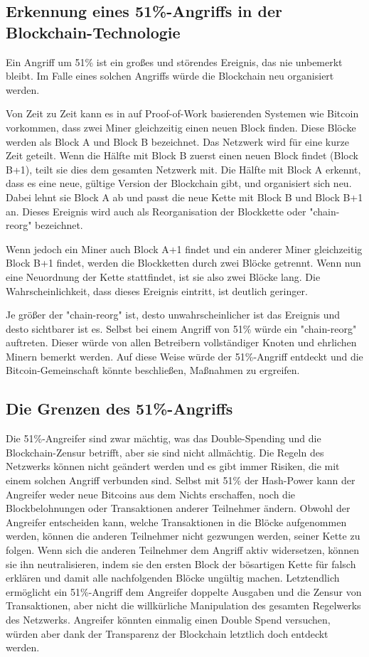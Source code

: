 \subsection{Erkennung eines 51\%-Angriffs in der Blockchain-Technologie}
Ein Angriff um 51\% ist ein großes und störendes Ereignis, das nie unbemerkt bleibt. Im Falle eines solchen Angriffs würde die Blockchain neu organisiert werden.

Von Zeit zu Zeit kann es in auf Proof-of-Work basierenden Systemen wie Bitcoin vorkommen, dass zwei Miner gleichzeitig einen neuen Block finden. Diese Blöcke werden als Block A und Block B bezeichnet. Das Netzwerk wird für eine kurze Zeit geteilt. Wenn die Hälfte mit Block B zuerst einen neuen Block findet (Block B+1), teilt sie dies dem gesamten Netzwerk mit. Die Hälfte mit Block A erkennt, dass es eine neue, gültige Version der Blockchain gibt, und organisiert sich neu. Dabei lehnt sie Block A ab und passt die neue Kette mit Block B und Block B+1 an. Dieses Ereignis wird auch als Reorganisation der Blockkette oder "chain-reorg" bezeichnet.

Wenn jedoch ein Miner auch Block A+1 findet und ein anderer Miner gleichzeitig Block B+1 findet, werden die Blockketten durch zwei Blöcke getrennt. Wenn nun eine Neuordnung der Kette stattfindet, ist sie also zwei Blöcke lang. Die Wahrscheinlichkeit, dass dieses Ereignis eintritt, ist deutlich geringer.

Je größer der "chain-reorg" ist, desto unwahrscheinlicher ist das Ereignis und desto sichtbarer ist es. Selbst bei einem Angriff von 51\% würde ein "chain-reorg" auftreten. Dieser würde von allen Betreibern vollständiger Knoten und ehrlichen Minern bemerkt werden. Auf diese Weise würde der 51\%-Angriff entdeckt und die Bitcoin-Gemeinschaft könnte beschließen, Maßnahmen zu ergreifen.

\subsection{Die Grenzen des 51\%-Angriffs}
Die 51\%-Angreifer sind zwar mächtig, was das Double-Spending und die Blockchain-Zensur betrifft, aber sie sind nicht allmächtig. Die Regeln des Netzwerks können nicht geändert werden und es gibt immer Risiken, die mit einem solchen Angriff verbunden sind. Selbst mit 51\% der Hash-Power kann der Angreifer weder neue Bitcoins aus dem Nichts erschaffen, noch die Blockbelohnungen oder Transaktionen anderer Teilnehmer ändern. Obwohl der Angreifer entscheiden kann, welche Transaktionen in die Blöcke aufgenommen werden, können die anderen Teilnehmer nicht gezwungen werden, seiner Kette zu folgen. Wenn sich die anderen Teilnehmer dem Angriff aktiv widersetzen, können sie ihn neutralisieren, indem sie den ersten Block der bösartigen Kette für falsch erklären und damit alle nachfolgenden Blöcke ungültig machen. Letztendlich ermöglicht ein 51\%-Angriff dem Angreifer doppelte Ausgaben und die Zensur von Transaktionen, aber nicht die willkürliche Manipulation des gesamten Regelwerks des Netzwerks. Angreifer könnten einmalig einen Double Spend versuchen, würden aber dank der Transparenz der Blockchain letztlich doch entdeckt werden.
